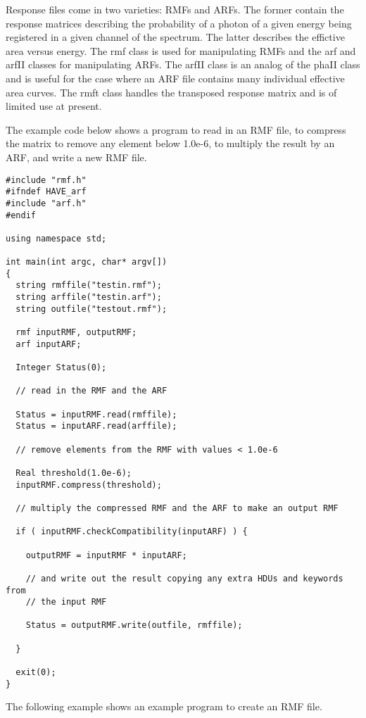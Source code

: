 \documentclass[11pt]{book}
\begin{document}
Response files come in two varieties: RMFs and ARFs. The former
contain the response matrices describing the probability of a photon
of a given energy being registered in a given channel of the
spectrum. The latter describes the effictive area versus energy. The rmf
class is used for manipulating RMFs and the arf and arfII classes for
manipulating ARFs. The arfII class is an analog of the phaII class and
is useful for the case where an ARF file contains many individual
effective area curves. The rmft class handles the transposed response matrix
and is of limited use at present.

The example code below shows a program to read in an RMF file, to
compress the matrix to remove any element below 1.0e-6, to multiply
the result by an ARF, and write a new RMF file.

\begin{verbatim}
#include "rmf.h"
#ifndef HAVE_arf
#include "arf.h"
#endif

using namespace std;

int main(int argc, char* argv[])
{
  string rmffile("testin.rmf");
  string arffile("testin.arf");
  string outfile("testout.rmf");

  rmf inputRMF, outputRMF;
  arf inputARF;

  Integer Status(0);

  // read in the RMF and the ARF

  Status = inputRMF.read(rmffile);
  Status = inputARF.read(arffile);

  // remove elements from the RMF with values < 1.0e-6

  Real threshold(1.0e-6);
  inputRMF.compress(threshold);

  // multiply the compressed RMF and the ARF to make an output RMF

  if ( inputRMF.checkCompatibility(inputARF) ) {

    outputRMF = inputRMF * inputARF;

    // and write out the result copying any extra HDUs and keywords from
    // the input RMF
    
    Status = outputRMF.write(outfile, rmffile);

  }

  exit(0);
}

\end{verbatim}

The following example shows an example program to create an RMF file.
\end{document}
